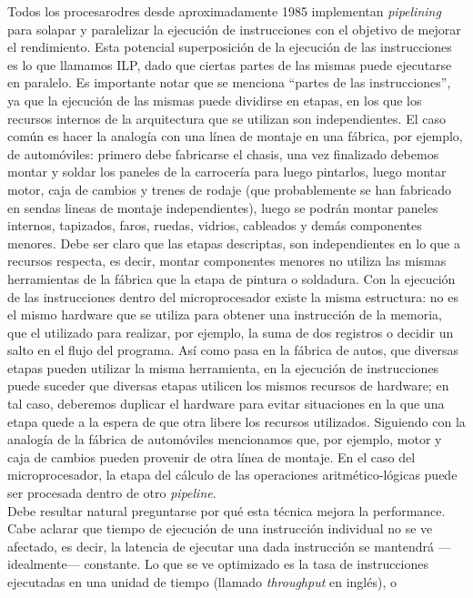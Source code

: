 Todos los procesarodres desde aproximadamente 1985 implementan 
\emph{pipelining} 
para solapar y paralelizar la ejecución de instrucciones con el objetivo de 
mejorar el rendimiento. Esta potencial superposición de la ejecución de las 
instrucciones es lo que llamamos ILP, dado que ciertas partes de las mismas 
puede ejecutarse en paralelo. Es importante notar que se menciona ``partes de 
las instrucciones'', ya que la ejecución de las mismas puede dividirse en 
etapas, en los que los recursos internos de la arquitectura que se utilizan son 
independientes. El caso común es hacer la analogía con una línea de montaje en 
una fábrica, por ejemplo, de automóviles: primero debe fabricarse el chasis, 
una 
vez finalizado debemos montar y soldar los paneles de la carrocería para luego 
pintarlos, luego montar motor, caja de cambios y trenes de rodaje (que 
probablemente se han fabricado en sendas lineas de montaje independientes), 
luego se podrán montar paneles internos, tapizados, faros, ruedas, vidrios, 
cableados y demás componentes menores. Debe ser claro que las etapas 
descriptas, 
son independientes en lo que a recursos respecta, es decir, montar componentes 
menores no utiliza las mismas herramientas de la fábrica que la etapa de 
pintura 
o soldadura. Con la ejecución de las instrucciones dentro del microprocesador 
existe la misma estructura: no es el mismo hardware que se utiliza para obtener 
una instrucción de la memoria, que el utilizado para realizar, por ejemplo, la 
suma de dos registros o decidir un salto en el flujo del programa. Así como 
pasa 
en la fábrica de autos, que diversas etapas pueden utilizar la misma 
herramienta, en la ejecución de instrucciones puede suceder que diversas etapas 
utilicen los mismos recursos de hardware; en tal caso, deberemos duplicar el 
hardware para evitar situaciones en la que una etapa quede a la espera de que 
otra libere los recursos utilizados. Siguiendo con la analogía de la fábrica de 
automóviles mencionamos que, por ejemplo, motor y caja de cambios pueden 
provenir de otra línea de montaje. En el caso del microprocesador, la etapa del 
cálculo de las operaciones aritmético-lógicas puede ser procesada dentro de 
otro 
\emph{pipeline}.\\
Debe resultar natural preguntarse por qué esta técnica mejora la performance. 
Cabe aclarar que tiempo de ejecución de una instrucción individual no se ve 
afectado, es decir, la latencia de ejecutar una dada instrucción se mantendrá 
---idealmente--- constante. Lo que se ve optimizado es la tasa de instrucciones 
ejecutadas en una unidad de tiempo (llamado \emph{throughput} en inglés), o 
